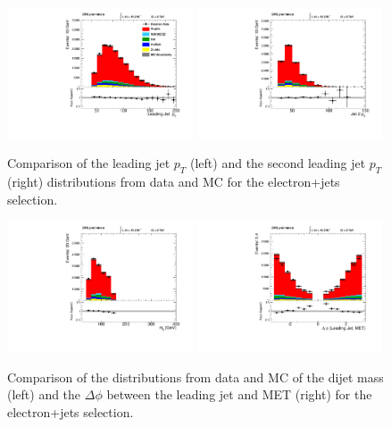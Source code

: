 \begin{figure}[h!t]
  {\centering
    \includegraphics[width=0.49\textwidth]{figs/n-1_plots_el/el_jetld_pt.pdf}
    \includegraphics[width=0.49\textwidth]{figs/n-1_plots_el/el_jetnt_pt.pdf}
    \caption{Comparison of the leading jet $p_{T} $ (left) and the
      second leading jet $p_{T} $ (right) distributions from data and MC
      for the electron+jets selection. 
      }
    \label{fig:elec_jet_pt}}
\end{figure}
\begin{figure}[h!t]
  {\centering
    \includegraphics[width=0.49\textwidth]{figs/n-1_plots_el/el_mjj.pdf}
    \includegraphics[width=0.49\textwidth]{figs/n-1_plots_el/el_deltaphi_jetldmet.pdf}

    \caption{Comparison of the distributions from data and MC of the
    dijet mass (left) and the $\Delta \phi $ between the leading jet and MET (right)
    for the electron+jets selection.}
    \label{fig:elec_dijetmass}}
\end{figure}
